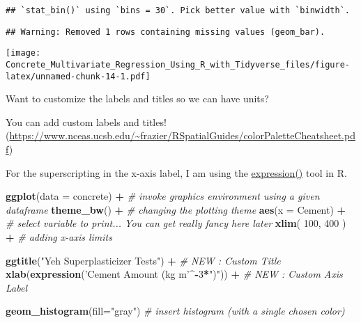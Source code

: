 \documentclass[]{article}
\newenvironment{Shaded}{\begin{snugshade}}{\end{snugshade}}
\newcommand{\CommentTok}[1]{\textcolor[rgb]{0.56,0.35,0.01}{\textit{#1}}}
\newcommand{\DataTypeTok}[1]{\textcolor[rgb]{0.13,0.29,0.53}{#1}}
\newcommand{\DecValTok}[1]{\textcolor[rgb]{0.00,0.00,0.81}{#1}}
\newcommand{\KeywordTok}[1]{\textcolor[rgb]{0.13,0.29,0.53}{\textbf{#1}}}
\newcommand{\NormalTok}[1]{#1}
\newcommand{\OperatorTok}[1]{\textcolor[rgb]{0.81,0.36,0.00}{\textbf{#1}}}
\newcommand{\StringTok}[1]{\textcolor[rgb]{0.31,0.60,0.02}{#1}}
\begin{document}
\begin{verbatim}
## `stat_bin()` using `bins = 30`. Pick better value with `binwidth`.
\end{verbatim}

\begin{verbatim}
## Warning: Removed 1 rows containing missing values (geom_bar).
\end{verbatim}

\texttt{[image: Concrete\_Multivariate\_Regression\_Using\_R\_with\_Tidyverse\_files/figure-latex/unnamed-chunk-14-1.pdf]}

Want to customize the labels and titles so we can have units?

You can add custom labels and titles!
(\url{https://www.nceas.ucsb.edu/~frazier/RSpatialGuides/colorPaletteCheatsheet.pdf})

For the superscripting in the x-axis label, I am using the
\href{http://vis.supstat.com/2013/04/mathematical-annotation-in-r/}{expression()}
tool in R.

\begin{Shaded}
\begin{Highlighting}[]
\KeywordTok{ggplot}\NormalTok{(}\DataTypeTok{data =}\NormalTok{ concrete) }\OperatorTok{+}\StringTok{     }\CommentTok{# invoke graphics environment using a given dataframe}
\StringTok{  }
\StringTok{  }\KeywordTok{theme_bw}\NormalTok{() }\OperatorTok{+}\StringTok{                }\CommentTok{# changing the plotting theme}
\StringTok{  }
\StringTok{  }\KeywordTok{aes}\NormalTok{(}\DataTypeTok{x =}\NormalTok{ Cement) }\OperatorTok{+}\StringTok{           }\CommentTok{# select variable to print... You can get really fancy here later}
\StringTok{  }
\StringTok{  }\KeywordTok{xlim}\NormalTok{( }\DecValTok{100}\NormalTok{, }\DecValTok{400}\NormalTok{ ) }\OperatorTok{+}\StringTok{          }\CommentTok{# adding x-axis limits}

\StringTok{  }\KeywordTok{ggtitle}\NormalTok{(}\StringTok{"Yeh Superplasticizer Tests"}\NormalTok{) }\OperatorTok{+}\StringTok{          }\CommentTok{# NEW : Custom Title}
\StringTok{  }
\StringTok{  }\KeywordTok{xlab}\NormalTok{(}\KeywordTok{expression}\NormalTok{(}\StringTok{'Cement Amount (kg m'}\OperatorTok{^-}\DecValTok{3}\OperatorTok{*}\StringTok{")"}\NormalTok{)) }\OperatorTok{+}\StringTok{ }\CommentTok{# NEW : Custom Axis Label}

\StringTok{  }\KeywordTok{geom_histogram}\NormalTok{(}\DataTypeTok{fill=}\StringTok{"gray"}\NormalTok{) }\CommentTok{# insert histogram (with a single chosen color)}
\end{Highlighting}
\end{Shaded}
\end{document}
